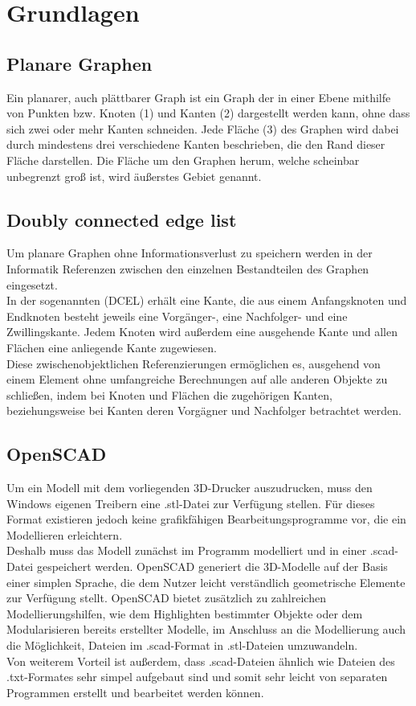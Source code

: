 \chapter{Grundlagen}
\section{Planare Graphen}
Ein planarer, auch plättbarer Graph ist ein Graph der in einer Ebene mithilfe von Punkten bzw. Knoten (1) und Kanten (2) dargestellt werden kann, ohne dass sich zwei oder mehr Kanten schneiden. 
Jede Fläche (3) des Graphen wird dabei durch mindestens drei verschiedene Kanten beschrieben, die den Rand dieser Fläche darstellen. 
Die Fläche um den Graphen herum, welche scheinbar unbegrenzt groß ist, wird äußerstes Gebiet genannt.
\section{Doubly connected edge list}
Um planare Graphen ohne Informationsverlust zu speichern werden in der Informatik Referenzen zwischen den einzelnen Bestandteilen des Graphen eingesetzt. \\
In der sogenannten  (DCEL) erhält eine Kante, die aus einem Anfangsknoten und Endknoten besteht jeweils eine Vorgänger-, eine Nachfolger- und eine Zwillingskante. 
Jedem Knoten wird außerdem eine ausgehende Kante und allen Flächen eine anliegende Kante zugewiesen. \\
Diese zwischenobjektlichen Referenzierungen ermöglichen es, ausgehend von einem Element ohne umfangreiche Berechnungen auf alle anderen Objekte zu schließen, indem bei Knoten und Flächen die zugehörigen Kanten, beziehungsweise bei Kanten deren Vorgägner und Nachfolger betrachtet werden.
\section{OpenSCAD}
Um ein Modell mit dem vorliegenden 3D-Drucker  auszudrucken, muss den Windows eigenen Treibern eine .stl-Datei zur Verfügung stellen.
Für dieses Format existieren jedoch keine grafikfähigen Bearbeitungsprogramme vor, die ein Modellieren erleichtern. \\
Deshalb muss das Modell zunächst im Programm  modelliert und in einer .scad-Datei gespeichert werden.
OpenSCAD generiert die 3D-Modelle auf der Basis einer simplen Sprache, die dem Nutzer leicht verständlich geometrische Elemente zur Verfügung stellt.
OpenSCAD bietet zusätzlich zu zahlreichen  Modellierungshilfen, wie dem Highlighten bestimmter Objekte oder dem Modularisieren bereits erstellter Modelle, im Anschluss an die Modellierung auch die Möglichkeit, Dateien im .scad-Format in .stl-Dateien umzuwandeln. \\
Von weiterem Vorteil ist außerdem, dass .scad-Dateien ähnlich wie Dateien des .txt-Formates sehr simpel aufgebaut sind und somit sehr leicht von separaten Programmen erstellt und bearbeitet werden können.
